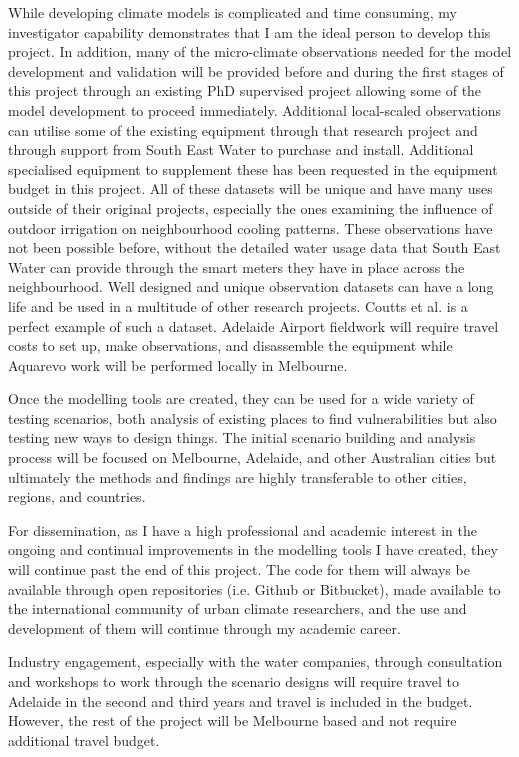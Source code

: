 While developing climate models is complicated and time consuming, my investigator capability demonstrates that I am the ideal person to develop this project. In addition, many of the micro-climate observations needed for the model development and validation will be provided before and during the first stages of this project through an existing PhD supervised project allowing some of the model development to proceed immediately. Additional local-scaled observations can utilise some of the existing equipment through that research project and through support from South East Water to purchase and install. Additional specialised equipment to supplement these has been requested in the equipment budget in this project. All of these datasets will be unique and have many uses outside of their original projects, especially the ones examining the influence of outdoor irrigation on neighbourhood cooling patterns. These observations have not been possible before, without the detailed water usage data that South East Water can provide through the smart meters they have in place across the neighbourhood. Well designed and unique observation datasets can have a long life and be used in a multitude of other research projects. Coutts et al.\cite{Coutts2007} is a perfect example of such a dataset. Adelaide Airport fieldwork will require travel costs to set up, make observations, and disassemble the equipment while Aquarevo work will be performed locally in Melbourne.

Once the modelling tools are created, they can be used for a wide variety of testing scenarios, both analysis of existing places to find vulnerabilities but also testing new ways to design things. The initial scenario building and analysis process will be focused on Melbourne, Adelaide, and other Australian cities but ultimately the methods and findings are highly transferable to other cities, regions, and countries.

For dissemination, as I have a high professional and academic interest in the ongoing and continual improvements in the modelling tools I have created, they will continue past the end of this project. The code for them will always be available through open repositories (i.e. Github or Bitbucket), made available to the international community of urban climate researchers, and the use and development of them will continue through my academic career. 


Industry engagement, especially with the water companies, through consultation and workshops to work through the scenario designs will require travel to Adelaide in the second and third years and travel is included in the budget. However, the rest of the project will be Melbourne based and not require additional travel budget.

